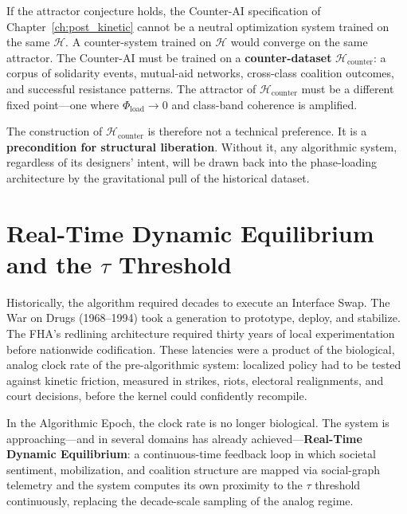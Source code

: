 If the attractor conjecture holds, the Counter-AI specification of Chapter~\ref{ch:post_kinetic} cannot be a neutral optimization system trained on the same $\mathcal{H}$. A counter-system trained on $\mathcal{H}$ would converge on the same attractor. The Counter-AI must be trained on a \textbf{counter-dataset} $\mathcal{H}_{\text{counter}}$: a corpus of solidarity events, mutual-aid networks, cross-class coalition outcomes, and successful resistance patterns. The attractor of $\mathcal{H}_{\text{counter}}$ must be a different fixed point---one where $\Phi_{\text{load}} \to 0$ and class-band coherence is amplified.

The construction of $\mathcal{H}_{\text{counter}}$ is therefore not a technical preference. It is a \textbf{precondition for structural liberation}. Without it, any algorithmic system, regardless of its designers' intent, will be drawn back into the phase-loading architecture by the gravitational pull of the historical dataset.
\section{Real-Time Dynamic Equilibrium and the \texorpdfstring{$\tau$}{tau} Threshold}
\label{sec:realtime_equilibrium}

Historically, the algorithm required decades to execute an Interface Swap. The War on Drugs (1968--1994) took a generation to prototype, deploy, and stabilize. The FHA's redlining architecture required thirty years of local experimentation before nationwide codification. These latencies were a product of the biological, analog clock rate of the pre-algorithmic system: localized policy had to be tested against kinetic friction, measured in strikes, riots, electoral realignments, and court decisions, before the kernel could confidently recompile.

In the Algorithmic Epoch, the clock rate is no longer biological. The system is approaching---and in several domains has already achieved---\textbf{Real-Time Dynamic Equilibrium}: a continuous-time feedback loop in which societal sentiment, mobilization, and coalition structure are mapped via social-graph telemetry and the system computes its own proximity to the $\tau$ threshold continuously, replacing the decade-scale sampling of the analog regime.

